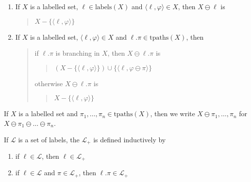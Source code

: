 \begin{enumerate}

\item If $X$ is a labelled set, $\ell\in\mathrm{labels}(X)$ and
  $\langle\ell,\varphi\rangle\in X$, then $X\ominus\ell$  is
  \begin{quote}
    $X-\{\langle\ell,\varphi\rangle\}$
  \end{quote}

\item If $X$ is a labelled set, $\langle\ell,\varphi\rangle\in X$ and
  $\ell.\pi\in\mathrm{tpaths}(X)$, then
  \begin{quote}
    if $\ell.\pi$ is branching in $X$, then $X\ominus\ell.\pi$ is
    \begin{quote}
      $(X-\{\langle\ell,\varphi\rangle\})\cup\{\langle\ell,\varphi\ominus\pi\rangle\}$
    \end{quote}
    otherwise $X\ominus\ell.\pi$ is
    \begin{quote}
      $X-\{\langle\ell,\varphi\rangle\}$
    \end{quote}
  \end{quote}

\end{enumerate}




If $X$ is a labelled set and
$\pi_1,\ldots,\pi_n\in\mathrm{tpaths}(X)$, then we write
$X\ominus\pi_1,\ldots,\pi_n$ for $X\ominus\pi_1\ominus\ldots\ominus\pi_n$.

 
  


If $\mathcal{L}$ is a set of labels, the $\mathcal{L}_+$ is defined
inductively by
\begin{enumerate} 
 
\item if $\ell\in\mathcal{L}$, then $\ell\in\mathcal{L}_+$ 
 
\item if $\ell\in\mathcal{L}$ and $\pi\in\mathcal{L}_+$, then $\ell.\pi\in\mathcal{L}_+$ 
 
\end{enumerate} 

